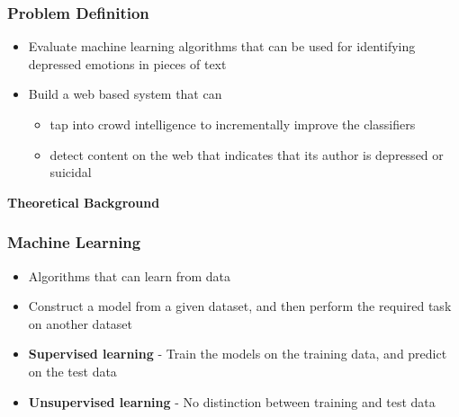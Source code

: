 \documentclass[9pt]{beamer}
\begin{document}
    \begin{frame}
        \frametitle{Problem Definition}
        \begin{itemize}
            \item{Evaluate machine learning algorithms that can be used for identifying depressed emotions in pieces of text}
            \item{
            Build a web based system that can
            \begin{itemize}
                \item{tap into crowd intelligence to incrementally improve the classifiers}
                \item{detect content on the web that indicates that its author is depressed or suicidal}
            \end{itemize}
            }
        \end{itemize}
    \end{frame}
    
    \begin{frame}
        \begin{center}
            \textbf{Theoretical Background}
        \end{center}
    \end{frame}
    
    \begin{frame}
        \frametitle{Machine Learning}
        \begin{itemize}
            \item{Algorithms that can learn from data}
            \item{Construct a model from a given dataset, and then perform the required task on another dataset}
            \item{\textbf{Supervised learning} - Train the models on the training data, and predict on the test data}
            \item{\textbf{Unsupervised learning} - No distinction between training and test data}
        \end{itemize}
    \end{frame}
    
\end{document}
